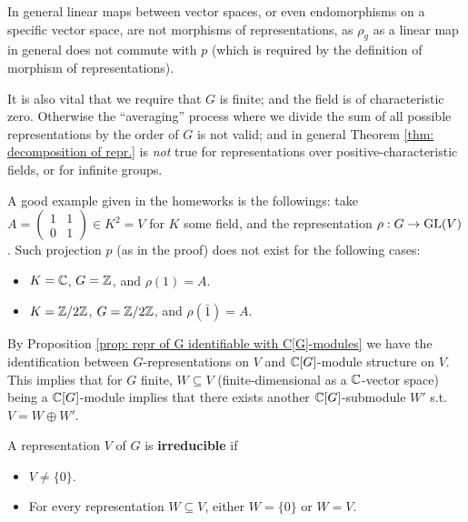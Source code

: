 \documentclass{article}
\begin{document}
\begin{remark}
    In general linear maps between vector spaces, or even endomorphisms on a specific vector space, are not morphisms of representations, as $\rho_g$ as a linear map in general does not commute with $p$ (which is required by the definition of morphism of representations).
\end{remark}

\begin{remark}\label{rmk: counterexample for nonzero char. field or infintie group}
    It is also vital that we require that $G$ is finite; and the field is of characteristic zero. Otherwise the ``averaging'' process where we divide the sum of all possible representations by the order of $G$ is not valid; and in general Theorem \ref{thm: decomposition of repr.} is \emph{not} true for representations over positive-characteristic fields, or for infinite groups.
    
    A good example given in the homeworks is the followings: take $A = \begin{pmatrix} 1 & 1 \\ 0 & 1 \end{pmatrix} \in K^2 = V$ for $K$ some field, and the representation $\rho: G \to \mathrm{GL}(V)$. Such projection $p$ (as in the proof) does not exist for the following cases:
    \begin{itemize}
        \item $K = \mathbb{C}$, $G = \mathbb{Z}$, and $\rho(1) = A$.
        \item $K = \mathbb{Z}/2\mathbb{Z}$, $G = \mathbb{Z}/2\mathbb{Z}$, and $\rho(\bar{1}) = A$.
    \end{itemize} 
\end{remark}

\begin{remark}
    By Proposition \ref{prop: repr of G identifiable with C[G]-modules} we have the identification between $G$-representations on $V$ and $\mathbb{C}[G]$-module structure on $V$. This implies that for $G$ finite, $W \subseteq V$ (finite-dimensional as a $\mathbb{C}$-vector space) being a $\mathbb{C}[G]$-module implies that there exists another $\mathbb{C}[G]$-submodule $W'$ s.t. $V = W \oplus W'$.
\end{remark}

\begin{definition}[Irreducible]
    A representation $V$ of $G$ is \textbf{irreducible} if
    \begin{itemize}
        \item $V \neq \{0\}$.
        \item For every representation $W \subseteq V$, either $W = \{0\}$ or $W = V$.
    \end{itemize}
\end{definition}
\end{document}
